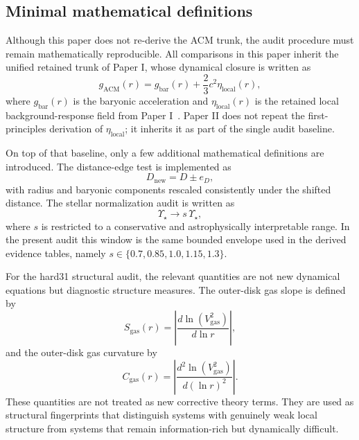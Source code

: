 ﻿\documentclass[aps,prd,twocolumn,superscriptaddress,longbibliography,nofootinbib,floatfix,10pt]{revtex4-2}
\begin{document}
\subsection{Minimal mathematical definitions}

Although this paper does not re-derive the ACM trunk, the audit procedure must
remain mathematically reproducible. All comparisons in this paper inherit the
unified retained trunk of Paper I, whose dynamical closure is written as
\begin{equation}
g_{\mathrm{ACM}}(r)=g_{\mathrm{bar}}(r)+\frac{2}{3}c^2\eta_{\mathrm{local}}(r),
\end{equation}
where $g_{\mathrm{bar}}(r)$ is the baryonic acceleration and
$\eta_{\mathrm{local}}(r)$ is the retained local background-response field from
Paper I~\cite{Liu2026PaperI}. Paper II does not repeat the first-principles
derivation of $\eta_{\mathrm{local}}$; it inherits it as part of the single
audit baseline.

On top of that baseline, only a few additional mathematical definitions are
introduced. The distance-edge test is implemented as
\begin{equation}
D_{\mathrm{new}} = D \pm e_D,
\end{equation}
with radius and baryonic components rescaled consistently under the shifted
distance. The stellar normalization audit is written as
\begin{equation}
\Upsilon_\star \rightarrow s\,\Upsilon_\star,
\end{equation}
where $s$ is restricted to a conservative and astrophysically interpretable
range. In the present audit this window is the same bounded envelope used in
the derived evidence tables, namely $s \in \{0.7, 0.85, 1.0, 1.15, 1.3\}$.

For the hard31 structural audit, the relevant quantities are not new dynamical
equations but diagnostic structure measures. The outer-disk gas slope is
defined by
\begin{equation}
S_{\mathrm{gas}}(r)=\left|\frac{d\ln(V_{\mathrm{gas}}^2)}{d\ln r}\right|,
\end{equation}
and the outer-disk gas curvature by
\begin{equation}
C_{\mathrm{gas}}(r)=\left|\frac{d^2\ln(V_{\mathrm{gas}}^2)}{d(\ln r)^2}\right|.
\end{equation}
These quantities are not treated as new corrective theory terms. They are used
as structural fingerprints that distinguish systems with genuinely weak local
structure from systems that remain information-rich but dynamically difficult.
\end{document}
